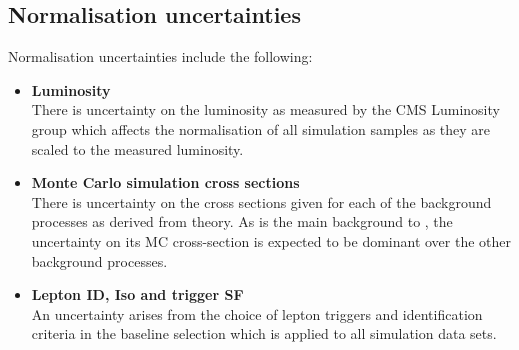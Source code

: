 \subsection{Normalisation uncertainties}
Normalisation uncertainties include the following:
\begin{itemize}
\item \textbf{Luminosity}\\
There is uncertainty on the luminosity as measured by the CMS Luminosity group which affects the normalisation of all simulation samples as they are scaled to the measured luminosity.

\item \textbf{Monte Carlo simulation cross sections}\\
There is uncertainty on the cross sections given for each of the background processes as derived from theory. As \ttbar is the main background to \tttt, the uncertainty on its MC cross-section is expected to be dominant over the other background processes. 

\item \textbf{Lepton ID, Iso and trigger SF}\\
An uncertainty arises from the choice of lepton triggers and identification criteria in the baseline selection which is applied to all simulation data sets.


\end{itemize}

